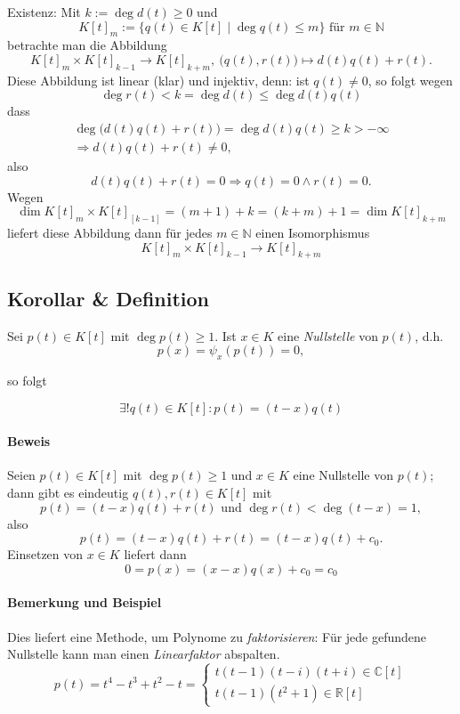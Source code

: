 	Existenz: Mit $ k := \deg d(t) \geq 0 $ und
		\[ K[t]_m := \{q(t)\in K[t]\mid \deg q(t)\leq m \} \text{ für }m\in \mathbb{N} \]
	betrachte man die Abbildung
		\[ K[t]_m \times K[t]_{k-1}\to K[t]_{k+m},\ \big(q(t), r(t)\big) \mapsto d(t)q(t)+r(t). \]
	Diese Abbildung ist linear (klar) und injektiv, denn:
	ist $ q(t) \neq 0 $, so folgt wegen
		\[ \deg r(t) < k = \deg d(t)\leq \deg d(t)q(t) \]
	dass %
		\begin{gather*}
			\deg \big(d(t)q(t) + r(t)\big) = \deg d(t)q(t)\geq k > -\infty\\
			\Rightarrow d(t)q(t)+r(t)\neq 0,
		\end{gather*}
	also
		\[ d(t)q(t)+r(t)=0 \Rightarrow q(t)=0 \land r(t) = 0. \] %
	Wegen
		\[ \dim K[t]_m \times K[t]_[k-1] = (m+1) + k = (k+m) + 1 = \dim K[t]_{k+m} \]
	liefert diese Abbildung dann für jedes $ m\in \mathbb{N} $ einen Isomorphismus
		\[ K[t]_m \times K[t]_{k-1} \to K[t]_{k+m} \]
\subsection{Korollar \& Definition}
	\begin{Definition}[Nullstelle]
	Sei $ p(t)\in K[t] $ mit $ \deg p(t)\geq 1 $. Ist $ x\in K $ eine \emph{Nullstelle} von $ p(t) $, d.h.
		\[ p(x) = \psi_x(p(t)) = 0, \]
	\end{Definition}
	so folgt
	\begin{Korollar}
		\[ \exists! q(t)\in K[t]: p(t) = (t-x) q(t) \]
	\end{Korollar}
\paragraph{Beweis}
	Seien $ p(t)\in K[t] $ mit $ \deg p(t) \geq 1 $ und $ x\in K $ eine Nullstelle von $ p(t) $; dann gibt es eindeutig $ q(t),r(t) \in K[t] $ mit
		\[ p(t) = (t-x) q(t) + r(t) \text{ und } \deg r(t) < \deg (t-x) = 1, \]
	also
		\[ p(t) = (t-x)q(t)+r(t) = (t-x)q(t)+c_0. \]
	Einsetzen von $ x\in K $ liefert dann
		\[ 0 = p(x) = (x-x)q(x) + c_0 = c_0 \]
\paragraph{Bemerkung und Beispiel}
	Dies liefert eine Methode, um Polynome zu \emph{faktorisieren}: Für jede gefundene Nullstelle kann man einen \emph{Linearfaktor} abspalten.
		\[ p(t)= t^4-t^3+t^2-t =
			\begin{cases}
				t(t-1)(t-i)(t+i) \in \mathbb{C}[t]\\
				t(t-1)(t^2+1) \in \mathbb{R}[t]
			\end{cases} \]
